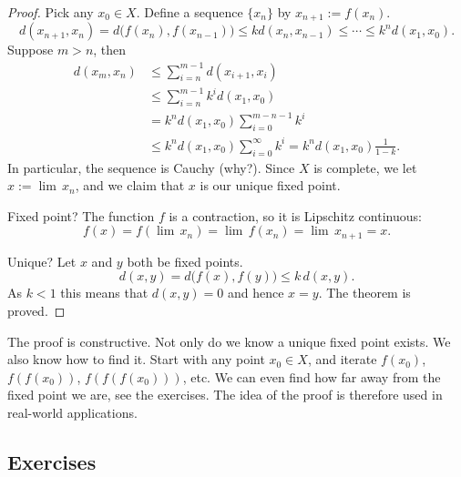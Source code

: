 \documentclass[12pt,openany]{book}
\theoremstyle{plain}
\theoremstyle{remark}
\theoremstyle{definition}
\theoremstyle{exercise}
\theoremstyle{example}
\begin{document}
\begin{proof}
Pick any $x_0 \in X$.
Define a sequence $\{ x_n \}$ by $x_{n+1} := f(x_n)$.
\begin{equation*}
d(x_{n+1},x_n) = d\bigl(f(x_n),f(x_{n-1})\bigr)
\leq k d(x_n,x_{n-1})
\leq \cdots
\leq k^n d(x_1,x_0) .
\end{equation*}
Suppose $m > n$, then
\begin{equation*}
\begin{split}
d(x_m,x_n)
& \leq \sum_{i=n}^{m-1} d(x_{i+1},x_i) \\
& \leq \sum_{i=n}^{m-1} k^i d(x_1,x_0) \\
& = k^n d(x_1,x_0) \sum_{i=0}^{m-n-1} k^i \\
& \leq k^n d(x_1,x_0) \sum_{i=0}^{\infty} k^i
= k^n d(x_1,x_0) \frac{1}{1-k} .
\end{split}
\end{equation*}
In particular, the sequence is Cauchy (why?).  Since $X$ is complete,
we let $x := \lim\, x_n$, and we claim that $x$
is our unique fixed point.

Fixed point?  The function $f$ is a contraction,
so it is Lipschitz continuous:
\begin{equation*}
f(x) = f( \lim \, x_n) = \lim\, f(x_n) = \lim\, x_{n+1} = x .
\end{equation*}

Unique?  Let $x$ and $y$ both be fixed points.
\begin{equation*}
d(x,y) = d\bigl(f(x),f(y)\bigr) \leq k\, d(x,y) .
\end{equation*}
As $k < 1$ this means that $d(x,y) = 0$ and hence $x=y$.  The theorem is
proved.
\end{proof}

The proof is constructive.  Not only do we know 
a unique fixed point exists.  We also know how to find it.  Start with
any point $x_0 \in X$, and iterate $f(x_0)$,
$f(f(x_0))$,
$f(f(f(x_0)))$, etc.  We can even find how far away
from the fixed point we are, see the exercises.  The idea of the proof is
therefore used in real-world applications.

\subsection{Exercises}
\end{document}
